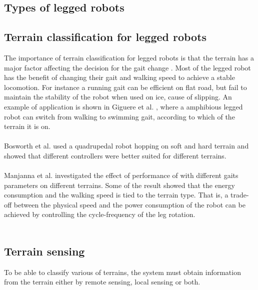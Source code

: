 \documentclass[USenglish]{ifimaster}  %
\begin{document}
\subsection{Types of legged robots}


\subsection{Terrain classification for legged robots}
The importance of terrain classification for legged robots is that the terrain has a major factor affecting the decision for the gait change \cite{6569179}. Most of the legged robot has the benefit of changing their gait and walking speed to achieve a stable locomotion. For instance a running gait can be efficient on flat road, but fail to maintain the stability of the robot when used on ice, cause of slipping. An example of application is shown in Giguere et al. \cite{Giguere06environmentidentification}, where a amphibious legged robot can switch from walking to swimming gait, according to which of the terrain it is on. 
\\
\\
Bosworth et al. \cite{7487541} used a quadrupedal robot hopping on soft and hard terrain and showed that different controllers were better suited for different terrains. 
\\
\\
Manjanna et al. \cite{6569179} investigated the effect of performance of with different gaits parameters on different terrains. Some of the result showed that the energy consumption and the walking speed is tied to the terrain type. That is, a trade-off between the physical speed and the power consumption of the robot can be achieved by controlling the cycle-frequency of the leg rotation.
\\
\\
\subsection{Terrain sensing}
To be able to classify various of terrains, the system must obtain information from the terrain either by remote sensing, local sensing or both.
\end{document}
